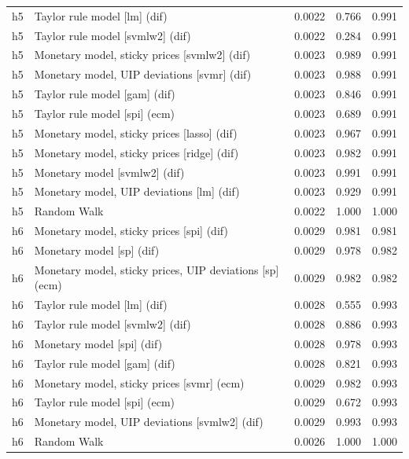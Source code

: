 \begin{ThreePartTable}
\begin{longtable}[t]{cp{5.5cm}ccc}
\addlinespace
h5 & \raggedright Taylor rule model [lm] (dif) & 0.0022 & 0.766 & 0.991\\
h5 & \raggedright Taylor rule model [svmlw2] (dif) & 0.0022 & 0.284 & 0.991\\
h5 & \raggedright Monetary model, sticky prices [svmlw2] (dif) & 0.0023 & 0.989 & 0.991\\
h5 & \raggedright Monetary model, UIP deviations [svmr] (dif) & 0.0023 & 0.988 & 0.991\\
h5 & \raggedright Taylor rule model [gam] (dif) & 0.0023 & 0.846 & 0.991\\
h5 & \raggedright Taylor rule model [spi] (ecm) & 0.0023 & 0.689 & 0.991\\
h5 & \raggedright Monetary model, sticky prices [lasso] (dif) & 0.0023 & 0.967 & 0.991\\
h5 & \raggedright Monetary model, sticky prices [ridge] (dif) & 0.0023 & 0.982 & 0.991\\
h5 & \raggedright Monetary model [svmlw2] (dif) & 0.0023 & 0.991 & 0.991\\
h5 & \raggedright Monetary model, UIP deviations [lm] (dif) & 0.0023 & 0.929 & 0.991\\
h5 & \raggedright Random Walk & 0.0022 & 1.000 & 1.000\\
\addlinespace
h6 & \raggedright Monetary model, sticky prices [spi] (dif) & 0.0029 & 0.981 & 0.981\\
h6 & \raggedright Monetary model [sp] (dif) & 0.0029 & 0.978 & 0.982\\
h6 & \raggedright Monetary model, sticky prices, UIP deviations [sp] (ecm) & 0.0029 & 0.982 & 0.982\\
h6 & \raggedright Taylor rule model [lm] (dif) & 0.0028 & 0.555 & 0.993\\
h6 & \raggedright Taylor rule model [svmlw2] (dif) & 0.0028 & 0.886 & 0.993\\
h6 & \raggedright Monetary model [spi] (dif) & 0.0028 & 0.978 & 0.993\\
h6 & \raggedright Taylor rule model [gam] (dif) & 0.0028 & 0.821 & 0.993\\
h6 & \raggedright Monetary model, sticky prices [svmr] (ecm) & 0.0029 & 0.982 & 0.993\\
h6 & \raggedright Taylor rule model [spi] (ecm) & 0.0029 & 0.672 & 0.993\\
h6 & \raggedright Monetary model, UIP deviations [svmlw2] (dif) & 0.0029 & 0.993 & 0.993\\
h6 & \raggedright Random Walk & 0.0026 & 1.000 & 1.000\\

\end{longtable}
\end{ThreePartTable}
